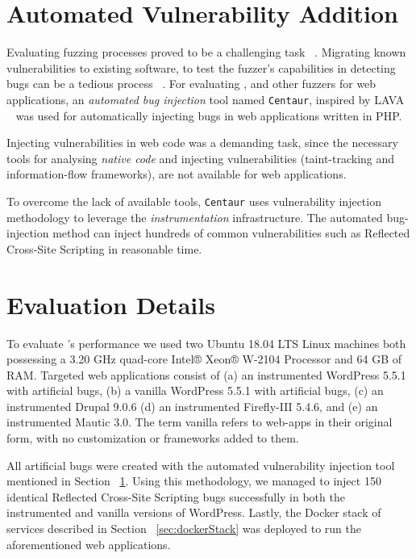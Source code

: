 \section{Automated Vulnerability Addition}\label{sec:automated}
Evaluating fuzzing processes proved to be a challenging task ~\cite{klees2018Evaluation}. Migrating known vulnerabilities to existing software, to test the fuzzer's capabilities in detecting bugs can be a tedious process ~\cite{bug-reproduction}. For evaluating \pname{}, and other fuzzers for web applications, an \emph{automated bug injection} tool named {\tt Centaur}, inspired by LAVA ~\cite{dolan2016lava} was used for automatically injecting bugs in web applications written in PHP. 

Injecting vulnerabilities in web code was a demanding task, since the necessary tools for analysing \emph{native code} and injecting vulnerabilities (\eg taint-tracking and information-flow frameworks), are not available for web applications. 

To overcome the lack of available tools, {\tt Centaur} uses vulnerability injection methodology to leverage the \emph{instrumentation} infrastructure. The automated bug-injection method can inject hundreds of common vulnerabilities such as Reflected Cross-Site Scripting in reasonable time. 

\section{Evaluation Details}
To evaluate \pname{}'s performance we used two Ubuntu 18.04 LTS Linux machines both possessing a 3.20 GHz quad-core Intel® Xeon® W-2104 Processor and 64 GB of RAM. Targeted web applications consist of (a) an instrumented WordPress 5.5.1 with artificial bugs, (b) a vanilla  WordPress 5.5.1 with artificial bugs, (c) an instrumented Drupal 9.0.6 (d) an instrumented Firefly-III 5.4.6, and (e) an instrumented Mautic 3.0. The term vanilla refers to web-apps in their original form, with no customization or frameworks added to them. 

All artificial bugs were created with the automated vulnerability injection tool mentioned in  Section ~\ref{sec:automated}. Using this methodology, we managed to inject 150 identical Reflected Cross-Site Scripting bugs successfully in both the instrumented and vanilla versions of WordPress. Lastly, the Docker stack of services described in Section ~\ref{sec:dockerStack} was deployed to run the aforementioned web applications.

